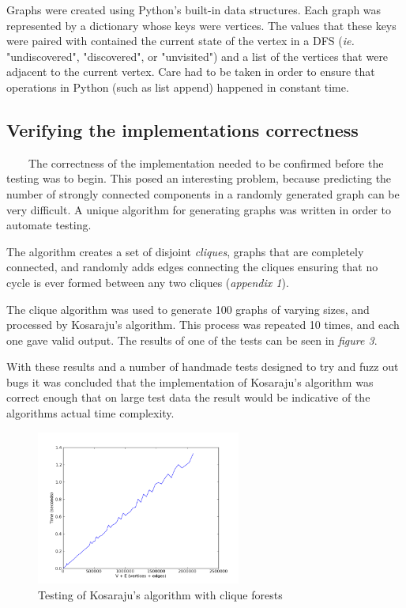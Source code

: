 \documentclass[12pt]{article}
\begin{document}
Graphs were created using Python's built-in data structures. Each graph was represented by a dictionary whose keys were vertices. The values that these keys were paired with contained the current state of the vertex in a DFS (\emph{ie.} "undiscovered", "discovered", or "unvisited") and a list of the vertices that were adjacent to the current vertex. Care had to be taken in order to ensure that operations in Python (such as list append) happened in constant time.

  \subsection{Verifying the implementations correctness}
  \ \ \ \ The correctness of the implementation needed to be confirmed before the testing was to begin. This posed an interesting problem, because predicting the number of strongly connected components in a randomly generated graph can be very difficult. A unique algorithm for generating graphs was written in order to automate testing.
  
  The algorithm creates a set of disjoint \emph{cliques}, graphs that are completely connected, and randomly adds edges connecting the cliques ensuring that no cycle is ever formed between any two cliques (\emph{appendix 1}).
  
  The clique algorithm was used to generate 100 graphs of varying sizes, and processed by Kosaraju's algorithm. This process was repeated 10 times, and each one gave valid output. The results of one of the tests can be seen in \emph{figure 3}.
  
  With these results and a number of handmade tests designed to try and fuzz out bugs it was concluded that the implementation of Kosaraju's algorithm was correct enough that on large test data the result would be indicative of the algorithms actual time complexity. 

\begin{figure}[h!]
    \centering
      \includegraphics[width=0.6\textwidth]{cliquesForTesting.png}
        \caption{Testing of Kosaraju's algorithm with clique forests}
\end{figure} 
\end{document}
